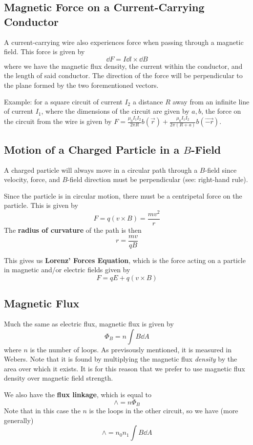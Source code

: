 \documentclass[12pt]{article}
\newcommand{\inint}[2]{\int #1 \dd #2}
\begin{document}
\subsection*{Magnetic Force on a Current-Carrying Conductor}
A current-carrying wire also experiences force when passing through a magnetic field. This force is given by \[ \dd F = I \dd l \times\dd B \] where we have the magnetic flux density, the current within the conductor, and the length of said conductor. The direction of the force will be perpendicular to the plane formed by the two forementioned vectors.

Example: for a square circuit of current $I_2$ a distance $R$ away from an infinite line of current $I_1$, where the dimensions of the circuit are given by $a,b$, the force on the circuit from the wire is given by $F = \frac{\mu_0 I_1 I_2}{2\pi R} b (\vec{r}) + \frac{\mu_0 I_1 I_2}{2\pi (R + a)} b (\vec{-r})$.

\subsection*{Motion of a Charged Particle in a $B$-Field}
A charged particle will always move in a circular path through a $B$-field since velocity, force, and $B$-field direction must be perpendicular (see: right-hand rule).

Since the particle is in circular motion, there must be a centripetal force on the particle. This is given by \[ F = q(v \times B) = \frac{mv^2}{r} \] The {\bf radius of curvature} of the path is then \[ r = \frac{mv}{qB} \]

This gives us {\bf Lorenz' Forces Equation}, which is the force acting on a particle in magnetic and/or electric fields given by \[ F = qE + q(v \times B) \]

\subsection*{Magnetic Flux}
Much the same as electric flux, magnetic flux is given by \[ \Phi_B = n\inint{B}{A} \] where $n$ is the number of loops. As previsously mentioned, it is measured in Webers. Note that it is found by multiplying the magnetic flux \emph{density} by the area over which it exists. It is for this reason that we prefer to use magnetic flux density over magnetic field strength.

We also have the {\bf flux linkage}, which is equal to \[ \land = n\Phi_B \] Note that in this case the $n$ is the loops in the other circuit, so we have (more generally) \[ \land = n_0n_1 \inint{B}{A} \]
\end{document}
